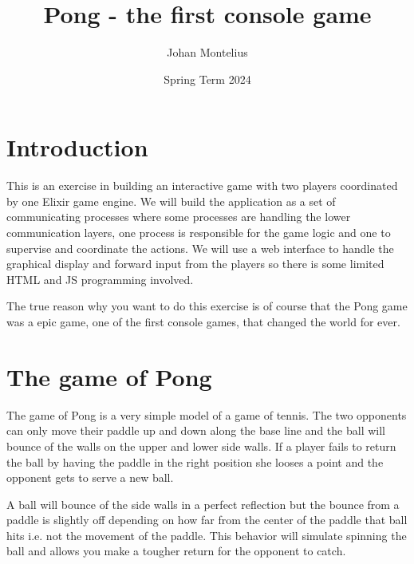 \documentclass[a4paper,11pt]{article}
\begin{document}
\title{Pong - the first console game}

\author{Johan Montelius}
\date{Spring Term 2024}

\maketitle


\section*{Introduction}

This is an exercise in building an interactive game with two players
coordinated by one Elixir game engine. We will build the application
as a set of communicating processes where some processes are handling
the lower communication layers, one process is responsible for the
game logic and one to supervise and coordinate the actions. We will
use a web interface to handle the graphical display and forward input
from the players so there is some limited HTML and JS programming
involved.

The true reason why you want to do this exercise is of course that
the Pong game was a epic game, one of the first console games, that
changed the world for ever. 

\section*{The game of Pong}

The game of Pong is a very simple model of a game of tennis. The two
opponents can only move their paddle up and down along the base line
and the ball will bounce of the walls on the upper and lower side
walls. If a player fails to return the ball by having the paddle in
the right position she looses a point and the opponent gets to serve a
new ball.

A ball will bounce of the side walls in a perfect reflection but the
bounce from a paddle is slightly off depending on how far from the
center of the paddle that ball hits i.e. not the movement of the
paddle. This behavior will simulate spinning the ball and allows you
make a tougher return for the opponent to catch. 
\end{document}
